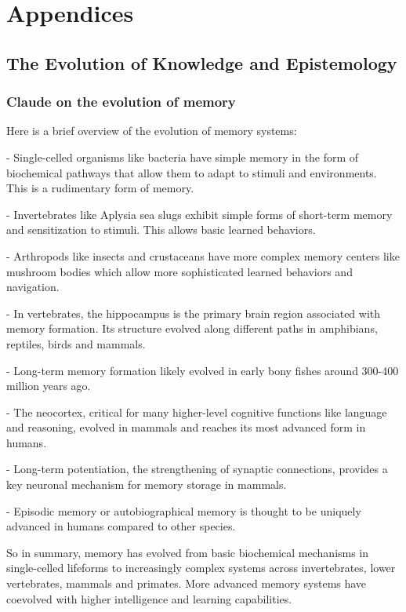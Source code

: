 \documentclass[10pt,titlepage]{book}
\begin{document}
\chapter{Appendices}

\section{The Evolution of Knowledge and Epistemology}

\subsection{Claude on the evolution of memory}

Here is a brief overview of the evolution of memory systems:

- Single-celled organisms like bacteria have simple memory in the form of biochemical pathways that allow them to adapt to stimuli and environments. This is a rudimentary form of memory.

- Invertebrates like Aplysia sea slugs exhibit simple forms of short-term memory and sensitization to stimuli. This allows basic learned behaviors.

- Arthropods like insects and crustaceans have more complex memory centers like mushroom bodies which allow more sophisticated learned behaviors and navigation. 

- In vertebrates, the hippocampus is the primary brain region associated with memory formation. Its structure evolved along different paths in amphibians, reptiles, birds and mammals.

- Long-term memory formation likely evolved in early bony fishes around 300-400 million years ago.

- The neocortex, critical for many higher-level cognitive functions like language and reasoning, evolved in mammals and reaches its most advanced form in humans.

- Long-term potentiation, the strengthening of synaptic connections, provides a key neuronal mechanism for memory storage in mammals.

- Episodic memory or autobiographical memory is thought to be uniquely advanced in humans compared to other species. 

So in summary, memory has evolved from basic biochemical mechanisms in single-celled lifeforms to increasingly complex systems across invertebrates, lower vertebrates, mammals and primates. More advanced memory systems have coevolved with higher intelligence and learning capabilities.
\end{document}
